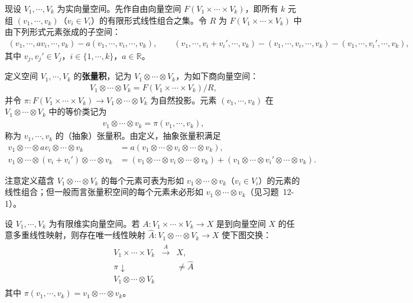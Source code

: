 \documentclass[../../main.tex]{subfiles}
\begin{document}
现设 $V_1,\cdots ,V_k$ 为实向量空间。先作自由向量空间 $F(V_1\times\cdots\times V_k)$，即所有 $k$ 元组 $(v_1,\cdots ,v_k)$（$v_i\in V_i$）的有限形式线性组合之集。令 $R$ 为 $F(V_1\times\cdots\times V_k)$ 中由下列形式元素张成的子空间：
\begin{align}
(v_1,\cdots ,a v_i,\cdots ,v_k)-a(v_1,\cdots ,v_i,\cdots ,v_k),\qquad
(v_1,\cdots ,v_i+v_i',\cdots ,v_k)-(v_1,\cdots ,v_i,\cdots ,v_k)-(v_1,\cdots ,v_i',\cdots ,v_k),\label{align:ch12-关系子空间}
\end{align}
其中 $v_j,v_j'\in V_j$，$i\in\{1,\cdots ,k\}$，$a\in\mathbb{R}$。

定义空间 $V_1,\cdots ,V_k$ 的\textbf{张量积}，记为 $V_1\otimes\cdots\otimes V_k$，为如下商向量空间：
\begin{align*}
V_1\otimes\cdots\otimes V_k=F(V_1\times\cdots\times V_k)/R,
\end{align*}
并令 $\pi\colon F(V_1\times\cdots\times V_k)\to V_1\otimes\cdots\otimes V_k$ 为自然投影。元素 $(v_1,\cdots ,v_k)$ 在 $V_1\otimes\cdots\otimes V_k$ 中的等价类记为
\begin{align}
v_1\otimes\cdots\otimes v_k=\pi(v_1,\cdots ,v_k),\label{align:ch12-抽象张量积}
\end{align}
称为 $v_1,\cdots ,v_k$ 的（抽象）张量积。由定义，抽象张量积满足
\begin{align*}
v_1\otimes\cdots\otimes a v_i\otimes\cdots\otimes v_k&=a(v_1\otimes\cdots\otimes v_i\otimes\cdots\otimes v_k),\\
v_1\otimes\cdots\otimes(v_i+v_i')\otimes\cdots\otimes v_k&=(v_1\otimes\cdots\otimes v_i\otimes\cdots\otimes v_k)+(v_1\otimes\cdots\otimes v_i'\otimes\cdots\otimes v_k).
\end{align*}

注意定义蕴含 $V_1\otimes\cdots\otimes V_k$ 的每个元素可表为形如 $v_1\otimes\cdots\otimes v_k$（$v_i\in V_i$）的元素的线性组合；但一般而言张量积空间的每个元素未必形如 $v_1\otimes\cdots\otimes v_k$（见习题~12-1）。

\begin{proposition}[张量积空间的特征性质]\label{proposition:ch12-张量积特征}
设 $V_1,\cdots ,V_k$ 为有限维实向量空间。若 $A\colon V_1\times\cdots\times V_k\to X$ 是到向量空间 $X$ 的任意多重线性映射，则存在唯一线性映射 $\widehat A\colon V_1\otimes\cdots\otimes V_k\to X$ 使下图交换：
\begin{align*}
\begin{array}{ccc}
V_1\times\cdots\times V_k & \xrightarrow{A} & X,\\
\pi\downarrow && \ne\widehat A\\
V_1\otimes\cdots\otimes V_k &&
\end{array}
\end{align*}
其中 $\pi(v_1,\cdots ,v_k)=v_1\otimes\cdots\otimes v_k$。
\end{proposition}
\end{document}
